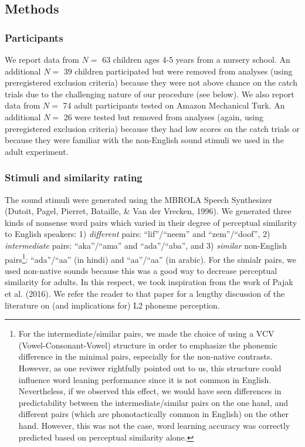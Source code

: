 \documentclass[english,,man]{apa6}
\let\rmarkdownfootnote\footnote%
\def\footnote{\protect\rmarkdownfootnote}
\begin{document}
\hypertarget{methods}{%
\subsection{Methods}\label{methods}}

\hypertarget{participants}{%
\subsubsection{Participants}\label{participants}}

We report data from \(N=\) 63 children ages 4-5 years from a nursery school. An additional \(N=\) 39 children participated but were removed from analyses (using preregistered exclusion criteria) because they were not above chance on the catch trials due to the challenging nature of our procedure (see below). We also report data from \(N=\) 74 adult participants tested on Amazon Mechanical Turk. An additional \(N=\) 26 were tested but removed from analyses (again, using preregistered exclusion criteria) because they had low scores on the catch trials or because they were familiar with the non-English sound stimuli we used in the adult experiment.

\hypertarget{stimuli-and-similarity-rating}{%
\subsubsection{Stimuli and similarity rating}\label{stimuli-and-similarity-rating}}

The sound stimuli were generated using the MBROLA Speech Synthesizer (Dutoit, Pagel, Pierret, Bataille, \& Van der Vrecken, 1996). We generated three kinds of nonsense word pairs which varied in their degree of perceptual similarity to English speakers: 1) \emph{different} pairs: \enquote{lif}/\enquote{neem} and \enquote{zem}/\enquote{doof}, 2) \emph{intermediate} pairs: \enquote{aka}/\enquote{ama} and \enquote{ada}/\enquote{aba}, and 3) \emph{similar} non-English pairs\footnote{For the intermediate/similar pairs, we made the choice of using a VCV (Vowel-Consonant-Vowel) structure in order to emphasize the phonemic difference in the minimal pairs, especially for the non-native contrasts. However, as one reviwer rightfully pointed out to us, this structure could influence word leaning performance since it is not common in English. Nevertheless, if we observed this effect, we would have seen differences in predictability between the intermediate/similar pairs on the one hand, and different pairs (which are phonotactically common in English) on the other hand. However, this was not the case, word learning accuracy was correctly predicted based on perceptual similarity alone.}: \enquote{ada}/\enquote{aa} (in hindi) and \enquote{aa}/\enquote{a\textipa{\textcrh}a} (in arabic). For the simialr pairs, we used non-native sounds because this was a good way to decrease perceptual similarity for adults. In this respect, we took inspiration from the work of Pajak et al. (2016). We refer the reader to that paper for a lengthy discussion of the literature on (and implications for) L2 phoneme perception.
\end{document}
